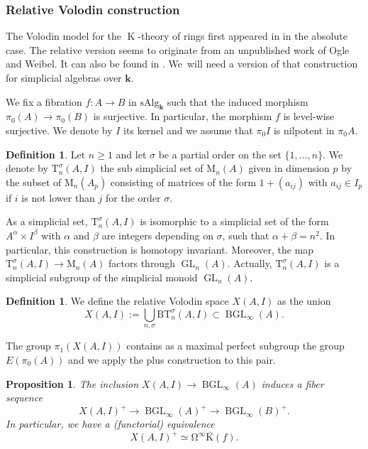 \documentclass[JEP,XML,SOM,Unicode,NoEqCountersInSection]{cedram}
\let\widebar\bar
\newtheorem{prop}[thm]{Proposition}
\theoremstyle{definition}
\newtheorem{df}[thm]{Definition}
\DeclareMathOperator{\BGL}{BGL}
\DeclareMathOperator{\K}{K}
\newcommand{\B}{\mathrm{B}}
\newcommand{\GL}{\operatorname{GL}}
\newcommand{\bK}{\widebar{\mathrm{K}}}
\newcommand{\infloop}{\operatorname{\Omega^\infty}}
\renewcommand{\k}{{\boldsymbol{k}}}
\newcommand{\sAlg}{\mathrm{sAlg}}
\begin{document}
\subsubsection{Relative Volodin construction}
The Volodin model for the $\K$-theory of rings first appeared in \cite{volodin:ktheory} in the absolute case. The relative version seems to originate from an unpublished work of Ogle and Weibel. It can also be found in \cite{loday:hc}. We~will need a version of that construction for simplicial algebras over $\k$.

We fix a fibration $f \colon A \to B$ in $\sAlg_\k$ such that the induced morphism $\pi_0(A) \to \pi_0(B)$ is surjective. In particular, the morphism $f$ is level-wise surjective. We denote by $I$ its kernel and we assume that $\pi_0I$ is nilpotent in $\pi_0A$.
\begin{df}
Let $n \geq 1$ and let $\sigma$ be a partial order on the set $\{1, \dots, n\}$. We denote by $\mathrm{T}^\sigma_n(A,I)$ the sub simplicial set of $\mathrm{M}_n(A)$ given in dimension $p$ by the subset of $\mathrm{M}_n(A_p)$ consisting of matrices of the form $1+(a_{ij})$ with $a_{ij} \in I_p$ if $i$ is not lower than $j$ for the order $\sigma$.
\end{df}

As a simplicial set, $\mathrm{T}^\sigma_n(A,I)$ is isomorphic to a simplicial set of the form $A^\alpha \times I^\beta$ with $\alpha$ and $\beta$ are integers depending on $\sigma$, such that $\alpha + \beta = n^2$. In particular, this construction is homotopy invariant.
Moreover, the map $\mathrm{T}^\sigma_n(A,I) \to \mathrm{M}_n(A)$ factors through $\GL_n(A)$. Actually, $\mathrm{T}^\sigma_n(A,I)$ is a simplicial subgroup of the simplicial monoid $\GL_n(A)$.

\begin{df}
We define the relative Volodin space $X(A,I)$ as the union\vspace*{-3pt}
\[
X(A,I) := \bigcup_{n, \sigma} \B\mathrm{T}^\sigma_n(A,I) \subset \BGL_\infty(A).
\]
\end{df}
\noindent The group $\pi_1(X(A,I))$ contains as a maximal perfect subgroup the group $E(\pi_0(A))$ and we apply the plus construction to this pair.

\begin{prop}
The inclusion $X(A,I) \to \BGL_\infty(A)$ induces a fiber sequence\vspace*{-3pt}
\[
X(A,I)^+ \to \BGL_\infty(A)^+ \to \BGL_\infty(B)^+.
\]
In particular, we have a (functorial) equivalence\vspace*{-3pt}
\[
X(A,I)^+ \simeq \infloop \bK(f).
\]
\end{prop}
\end{document}
